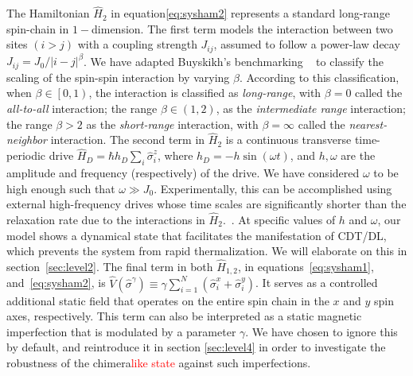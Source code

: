 \documentclass[12pt]{iopart}
\newcommand{\red}[1]{\textcolor{red}{#1}}
\begin{document}
The Hamiltonian $\hat{H}_2$ in equation\eqref{eq:sysham2} represents a standard long-range spin-chain in $1-$dimension. The first term models the interaction between two sites $(i>j)$ with a coupling strength $J_{ij}$, assumed to follow a power-law decay $J_{ij}={J_0}/{|i-j|^\beta}$. We have adapted Buyskikh's benchmarking ~\cite{buyskikh_entanglement_2016} to classify the scaling of the spin-spin interaction by varying $\beta$. According to this classification, when $\beta\in\left[0,1\right)$, the interaction is classified as \textit{long-range}, with $\beta=0$ called the \textit{all-to-all} interaction; the range $\beta\in \left(1,2\right)$, as the \textit{ intermediate range} interaction; the range $\beta > 2$ as the \textit{ short-range} interaction, with $\beta= \infty$ called the \textit{ nearest-neighbor} interaction. The second term in $\hat{H}_2$ is a continuous transverse time-periodic drive $\displaystyle \hat{H}_D=\hbar h_D \sum_i\hat{\sigma}^z_i$, where $\displaystyle h_D = -h\sin{(\omega t)}$, and $h,\omega$ are the amplitude and frequency (respectively) of the drive. We have considered $\omega$ to be high enough such that $\omega\gg J_0$. 	Experimentally, this can be accomplished using external high-frequency drives whose time scales are significantly shorter than the relaxation rate due to the interactions in $\hat{H}_2$.~\cite{choi_observation_2017,zhang_observation_2017,Cirac_1995,Blatt_2012}. At specific values of $h$ and $\omega$, our model shows a dynamical state that facilitates the manifestation of CDT/DL, which prevents the system from rapid thermalization. We will elaborate on this in section~\ref{sec:level2}. The final term in both $\hat{H}_{1,2}$, in equations~\eqref{eq:sysham1}, and~\eqref{eq:sysham2}, is $\displaystyle \hat{V}(\hat{\sigma}^{\gamma}) \equiv\gamma  \sum_{i=1}^{N} (\hat{\sigma}^x_i + \hat{\sigma}^y_i)$. It serves as a controlled additional static field that operates on the entire spin chain in the $x$ and $y$ spin axes, respectively.  This term can also be interpreted as a static magnetic imperfection that is modulated by a parameter $\gamma$. We have chosen to ignore this by default, and reintroduce it in section \ref{sec:level4} in order to investigate the robustness of the chimera\red{like state} against such imperfections.
\end{document}
